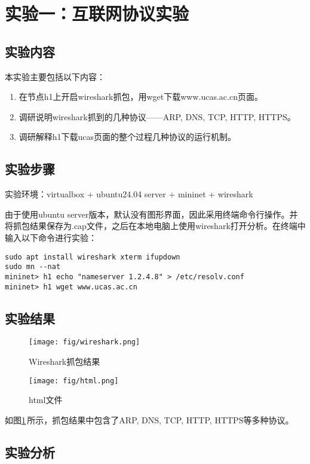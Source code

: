 \documentclass[11pt]{article}
\begin{document}


\section{实验一：互联网协议实验}
\subsection{实验内容}
本实验主要包括以下内容：
\begin{enumerate}
  \item 在节点h1上开启wireshark抓包，用wget下载www.ucas.ac.cn页面。
  \item 调研说明wireshark抓到的几种协议——ARP, DNS, TCP, HTTP, HTTPS。
  \item 调研解释h1下载ucas页面的整个过程几种协议的运行机制。
\end{enumerate}

\subsection{实验步骤}
实验环境：virtualbox + ubuntu24.04 server + mininet + wireshark

由于使用ubuntu server版本，默认没有图形界面，因此采用终端命令行操作。并将抓包结果保存为.cap文件，之后在本地电脑上使用wireshark打开分析。在终端中输入以下命令进行实验：
\begin{lstlisting}
sudo apt install wireshark xterm ifupdown
sudo mn --nat
mininet> h1 echo "nameserver 1.2.4.8" > /etc/resolv.conf
mininet> h1 wget www.ucas.ac.cn
\end{lstlisting}

\subsection{实验结果}
\begin{figure}[H]
  \centering
  \texttt{[image: fig/wireshark.png]}
  \caption{Wireshark抓包结果}
  \label{fig:wireshark}
\end{figure}

\begin{figure}[H]
  \centering
  \texttt{[image: fig/html.png]}
  \caption{html文件}
  \label{fig:html}
\end{figure}

如图\ref{fig:wireshark}\,所示，抓包结果中包含了ARP, DNS, TCP, HTTP, HTTPS等多种协议。

\subsection{实验分析}
\end{document}
